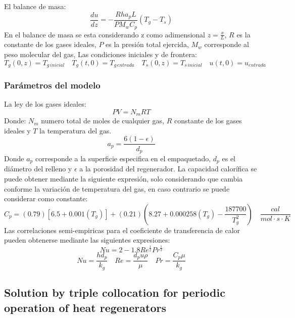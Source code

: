 \documentclass[12pt,letterpaper,final]{article}%
\begin{document}
\newline
El balance de masa:
\begin{equation}
	\frac{du}{dz} = -\frac{Rha_pL}{PM_wC_p}(T_g-T_s)
\end{equation}
En el balance de masa se esta considerando z como adimensional $z=\frac{x}{L}$, $R$ es la constante de los gases ideales, $P$ es la presión total ejercida, $M_w$ corresponde al peso molecular del gas, 
\newline
Las condiciones iniciales y de frontera:
\begin{equation*}
	T_g(0,z)=T_{g \,inicial} \quad T_g(t,0)=T_{g \,entrada} \quad T_s(0,z)= T_{s \, inicial} \quad u(t,0) = u_{entrada}
\end{equation*}
\subsubsection*{Parámetros del modelo}
La ley de los gases ideales:
\begin{equation}
	PV=N_m R T
\end{equation}
Donde: $N_m$ numero total de moles de cualquier gas, $R$ constante de los gases ideales y $T$ la temperatura del gas.
\begin{equation}
	a_p=\frac{6(1-\epsilon)}{d_p}
\end{equation}
Donde $a_p$ corresponde a la superficie especifica en el empaquetado, $d_p$ es el diámetro del relleno y $\epsilon$ a la porosidad del regenerador. 
\newline
La capacidad calorífica se puede obtener mediante la siguiente expresión, solo considerando que cambia conforme la variación de temperatura del gas\cite{green2018perry}, en caso contrario se puede considerar como constante:
\begin{equation}
	C_p=(0.79)[6.5+0.001(T_g)] + (0.21)(8.27+0.000258(T_g)-\frac{187700}{T_g^2}) \quad \frac{cal}{mol\cdot s \cdot K}
	\end{equation}
Las correlaciones semi-empiricas para el coeficiente de transferencia de calor pueden obtenerse mediante las siguientes expresiones\cite{Levenspiel1983}:
\begin{equation}
	Nu = 2 - 1.8 Re^{\frac{1}{2}}Pr^{\frac{1}{3}}
\end{equation}
\begin{equation*}
	Nu = \frac{hd_p}{k_g} \quad Re = \frac{d_p u\rho}{\mu} \quad Pr=\frac{C_p \mu }{k_g}
\end{equation*}

\subsection*{Solution by triple collocation for periodic operation of heat regenerators}
\end{document}
